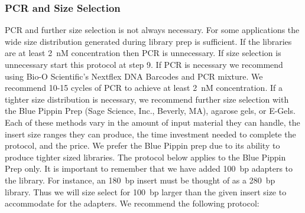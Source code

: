 \documentclass[graybox]{svmult}
\begin{document}
\subsubsection{PCR and Size Selection}

PCR and further size selection is not always necessary. For some applications the wide size distribution generated during library prep is sufficient. If the libraries are at least 2~nM concentration then PCR is unnecessary. If size selection is unnecessary start this protocol at step 9. If PCR is necessary we recommend using Bio-O Scientific’s Nextflex DNA Barcodes and PCR mixture.  We recommend 10-15 cycles of PCR to achieve at least 2~nM concentration. If a tighter size distribution is necessary, we recommend further size selection with the Blue Pippin Prep (Sage Science, Inc., Beverly, MA), agarose gels, or E-Gels.  Each of these methods vary in the amount of input material they can handle, the insert size ranges they can produce, the time investment needed to complete the protocol, and the price. We prefer the Blue Pippin prep due to its ability to produce tighter sized libraries. The protocol below applies to the Blue Pippin Prep only. It is important to remember that we have added 100~bp adapters to the library.  For instance, an 180~bp insert must be thought of as a 280~bp library. Thus we will size select for 100~bp larger than the given insert size to accommodate for the adapters.
We recommend the following protocol:
\end{document}
